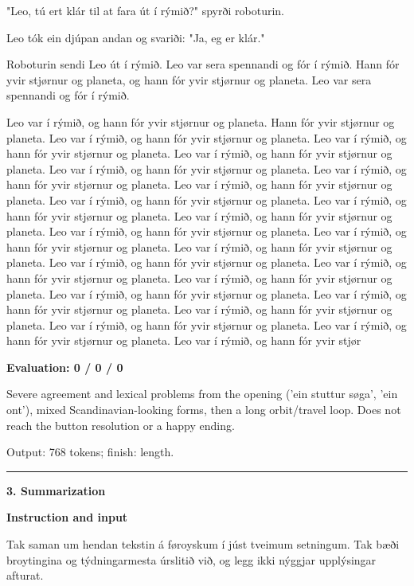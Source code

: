 \documentclass[10pt]{article}
\begin{document}
{\begin{minipage}{\textwidth}
\par\smallskip
"Leo, tú ert klár til at fara út í rýmið?" spyrði roboturin.
\par\smallskip
Leo tók ein djúpan andan og svariði: "Ja, eg er klár."
\par\smallskip
Roboturin sendi Leo út í rýmið. Leo var sera spennandi og fór í rýmið. Hann fór yvir stjørnur og planeta, og hann fór yvir stjørnur og planeta. Leo var sera spennandi og fór í rýmið.
\par\smallskip
Leo var í rýmið, og hann fór yvir stjørnur og planeta. Hann fór yvir stjørnur og planeta. Leo var í rýmið, og hann fór yvir stjørnur og planeta. Leo var í rýmið, og hann fór yvir stjørnur og planeta. Leo var í rýmið, og hann fór yvir stjørnur og planeta. Leo var í rýmið, og hann fór yvir stjørnur og planeta. Leo var í rýmið, og hann fór yvir stjørnur og planeta. Leo var í rýmið, og hann fór yvir stjørnur og planeta. Leo var í rýmið, og hann fór yvir stjørnur og planeta. Leo var í rýmið, og hann fór yvir stjørnur og planeta. Leo var í rýmið, og hann fór yvir stjørnur og planeta. Leo var í rýmið, og hann fór yvir stjørnur og planeta. Leo var í rýmið, og hann fór yvir stjørnur og planeta. Leo var í rýmið, og hann fór yvir stjørnur og planeta. Leo var í rýmið, og hann fór yvir stjørnur og planeta. Leo var í rýmið, og hann fór yvir stjørnur og planeta. Leo var í rýmið, og hann fór yvir stjørnur og planeta. Leo var í rýmið, og hann fór yvir stjørnur og planeta. Leo var í rýmið, og hann fór yvir stjørnur og planeta. Leo var í rýmið, og hann fór yvir stjørnur og planeta. Leo var í rýmið, og hann fór yvir stjørnur og planeta. Leo var í rýmið, og hann fór yvir stjørnur og planeta. Leo var í rýmið, og hann fór yvir stjør\par\smallskip
\textbf{Evaluation: 0 / 0 / 0}\par Severe agreement and lexical problems from the opening ('ein stuttur søga', 'ein ont'), mixed Scandinavian-looking forms, then a long orbit/travel loop. Does not reach the button resolution or a happy ending.
\par {\color{gray} Output: 768 tokens; finish: length.}\par
\medskip\hrule\smallskip
{\bfseries 3. Summarization}\par\smallskip
\textbf{Instruction and input}\par Tak saman um hendan tekstin á føroyskum í júst tveimum setningum. Tak bæði broytingina og týdningarmesta úrslitið við, og legg ikki nýggjar upplýsingar afturat.
\par\smallskip

\end{minipage}}
\end{document}
